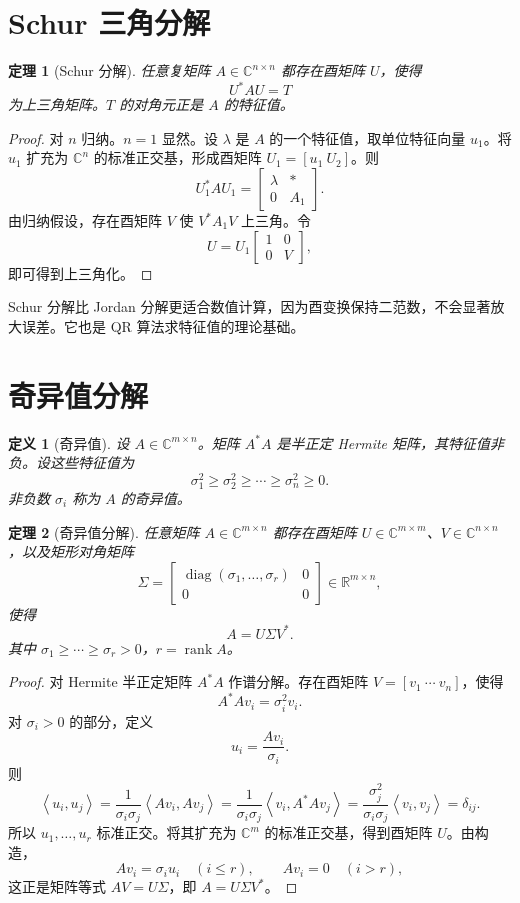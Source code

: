 \documentclass[UTF8,openany,zihao=-4]{ctexbook}
\theoremstyle{cnplain}
\newtheorem{definition}{定义}[chapter]
\newtheorem{theorem}{定理}[chapter]
\newcommand{\R}{\mathbb R}
\newcommand{\C}{\mathbb C}
\newcommand{\rank}{\operatorname{rank}}
\newcommand{\diag}{\operatorname{diag}}
\newcommand{\inner}[2]{\left\langle #1,#2\right\rangle}
\begin{document}
\section{Schur 三角分解}

\begin{theorem}[Schur 分解]
任意复矩阵 $A\in\C^{n\times n}$ 都存在酉矩阵 $U$，使得
\[
U^*AU=T
\]
为上三角矩阵。$T$ 的对角元正是 $A$ 的特征值。
\end{theorem}

\begin{proof}
对 $n$ 归纳。$n=1$ 显然。设 $\lambda$ 是 $A$ 的一个特征值，取单位特征向量 $u_1$。将 $u_1$ 扩充为 $\C^n$ 的标准正交基，形成酉矩阵 $U_1=[u_1\ U_2]$。则
\[
U_1^*AU_1=
\begin{bmatrix}
\lambda&*\\
0&A_1
\end{bmatrix}.
\]
由归纳假设，存在酉矩阵 $V$ 使 $V^*A_1V$ 上三角。令
\[
U=U_1\begin{bmatrix}1&0\\0&V\end{bmatrix},
\]
即可得到上三角化。
\end{proof}

Schur 分解比 Jordan 分解更适合数值计算，因为酉变换保持二范数，不会显著放大误差。它也是 QR 算法求特征值的理论基础。

\section{奇异值分解}

\begin{definition}[奇异值]
设 $A\in\C^{m\times n}$。矩阵 $A^*A$ 是半正定 Hermite 矩阵，其特征值非负。设这些特征值为
\[
\sigma_1^2\ge\sigma_2^2\ge\cdots\ge\sigma_n^2\ge0.
\]
非负数 $\sigma_i$ 称为 $A$ 的奇异值。
\end{definition}

\begin{theorem}[奇异值分解]
任意矩阵 $A\in\C^{m\times n}$ 都存在酉矩阵 $U\in\C^{m\times m}$、$V\in\C^{n\times n}$，以及矩形对角矩阵
\[
\Sigma=\begin{bmatrix}
\diag(\sigma_1,
\ldots,\sigma_r)&0\\
0&0
\end{bmatrix}\in\R^{m\times n},
\]
使得
\[
A=U\Sigma V^*.
\]
其中 $\sigma_1\ge\cdots\ge\sigma_r>0$，$r=\rank A$。
\end{theorem}

\begin{proof}
对 Hermite 半正定矩阵 $A^*A$ 作谱分解。存在酉矩阵 $V=[v_1\ \cdots\ v_n]$，使得
\[
A^*Av_i=\sigma_i^2v_i.
\]
对 $\sigma_i>0$ 的部分，定义
\[
u_i=\frac{Av_i}{\sigma_i}.
\]
则
\[
\inner{u_i}{u_j}
=\frac{1}{\sigma_i\sigma_j}\inner{Av_i}{Av_j}
=\frac{1}{\sigma_i\sigma_j}\inner{v_i}{A^*Av_j}
=\frac{\sigma_j^2}{\sigma_i\sigma_j}\inner{v_i}{v_j}
=\delta_{ij}.
\]
所以 $u_1,
\ldots,u_r$ 标准正交。将其扩充为 $\C^m$ 的标准正交基，得到酉矩阵 $U$。由构造，
\[
Av_i=\sigma_i u_i\quad(i\le r),
\qquad
Av_i=0\quad(i>r),
\]
这正是矩阵等式 $AV=U\Sigma$，即 $A=U\Sigma V^*$。
\end{proof}
\end{document}
